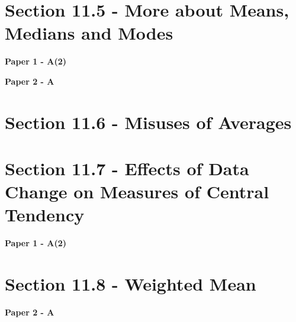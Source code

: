 \documentclass[12pt, a4paper]{article}
\begin{document}
\section*{Section 11.5 - More about Means, Medians and Modes}\label{section:3-11-5}

\textbf{Paper 1 - A(2)}
\begin{enumx}[label=\arabic*.,start=12]
\item {}\label{DSE2012-CoreP1-Q10} 
\end{enumx}
\textbf{Paper 2 - A}
\begin{enumx}[label=\arabic*.,start=13]
\item {}\label{DSE2020-CoreP2-Q30} 
\end{enumx}




\section*{Section 11.6 - Misuses of Averages}\label{section:3-11-6}





\section*{Section 11.7 - Effects of Data Change on Measures of Central Tendency \NF}\label{section:3-11-7}

\textbf{Paper 1 - A(2)}
\begin{enumx}[label=\arabic*.,start=14]
\item {}\label{DSE2021-CoreP1-Q11} 
\end{enumx}




\section*{Section 11.8 - Weighted Mean}\label{section:3-11-8}

\textbf{Paper 2 - A}
\begin{enumx}[label=\arabic*.,start=15]
\item {}\label{DSE2022-CoreP2-Q29} 
\end{enumx}
\end{document}
